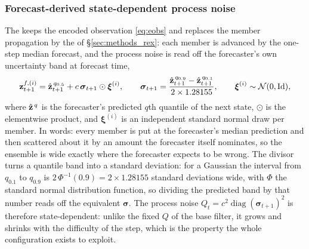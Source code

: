 \subsubsection{Forecast-derived state-dependent process noise}
\label{sec:methods_rexenkf}

The \FnoiseKF{} keeps the encoded observation \eqref{eq:eobs} and
replaces the member propagation by the \DirectFC{} of
\S\ref{sec:methods_rex}: each member is advanced by the one-step median
forecast, and the process noise is read off the forecaster's own
uncertainty band at forecast time,
\begin{equation}
  \mathbf{z}^{f,(i)}_{t+1} = \hat{\mathbf{z}}^{\,q_{0.5}}_{t+1}
  + c\,\boldsymbol{\sigma}_{t+1} \odot \boldsymbol{\xi}^{(i)},
  \qquad
  \boldsymbol{\sigma}_{t+1}
  = \frac{\hat{\mathbf{z}}^{\,q_{0.9}}_{t+1} - \hat{\mathbf{z}}^{\,q_{0.1}}_{t+1}}
         {2 \times 1.28155},
  \qquad \boldsymbol{\xi}^{(i)} \sim \mathcal{N}(0, \mathrm{Id}),
  \label{eq:rex_q}
\end{equation}
where $\hat{\mathbf{z}}^{\,q}$ is the forecaster's predicted $q$th quantile of the
next state, $\odot$ is the elementwise product, and $\boldsymbol{\xi}^{(i)}$ is
an independent standard normal draw per member. In words: every member is put at
the forecaster's median prediction and then scattered about it by an amount the
forecaster itself nominates, so the ensemble is wide exactly where the
forecaster expects to be wrong. The divisor turns a quantile band into a
standard deviation: for a Gaussian the interval from $q_{0.1}$ to $q_{0.9}$ is
$2\,\Phi^{-1}(0.9) = 2 \times 1.28155$ standard deviations wide, with $\Phi$ the
standard normal distribution function, so dividing the predicted band by that
number reads off the equivalent $\boldsymbol{\sigma}$. The process noise
$Q_t = c^2\operatorname{diag}(\boldsymbol{\sigma}_{t+1})^2$ is therefore
state-dependent: unlike the fixed $Q$ of the base filter, it grows and shrinks
with the difficulty of the step, which is the property the whole configuration
exists to exploit.\re

